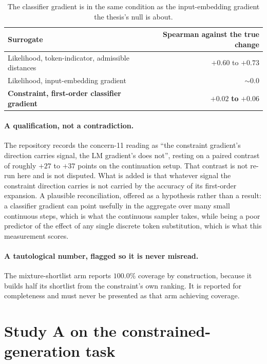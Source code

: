 \documentclass[11pt,a4paper]{article}
\begin{document}
\begin{table}[htbp]
\centering
\begin{tabular}{lr}
\toprule
Surrogate & Spearman against the true change \\
\midrule
Likelihood, token-indicator, admissible distances & $+0.60$ to $+0.73$ \\
Likelihood, input-embedding gradient & ${\sim}0.0$ \\
\textbf{Constraint, first-order classifier gradient} & $\bm{+0.02}$ \textbf{to} $\bm{+0.06}$ \\
\bottomrule
\end{tabular}
\caption{The classifier gradient is in the same condition as the input-embedding
gradient the thesis's null is about.}
\end{table}

\paragraph{A qualification, not a contradiction.}
The repository records the concern-11 reading as ``the constraint gradient's direction
carries signal, the LM gradient's does not'', resting on a paired contrast of roughly
$+27$ to $+37$ points on the continuation setup. That contrast is not re-run here and is
not disputed. What is added is that whatever signal the constraint direction carries is
not carried by the accuracy of its first-order expansion. A plausible reconciliation,
offered as a hypothesis rather than a result: a classifier gradient can point usefully in
the aggregate over many small continuous steps, which is what the continuous sampler
takes, while being a poor predictor of the effect of any single discrete token
substitution, which is what this measurement scores.

\paragraph{A tautological number, flagged so it is never misread.}
The mixture-shortlist arm reports $100.0\%$ coverage by construction, because it builds
half its shortlist from the constraint's own ranking. It is reported for completeness and
must never be presented as that arm achieving coverage.

\section{Study A on the constrained-generation task}
\end{document}
